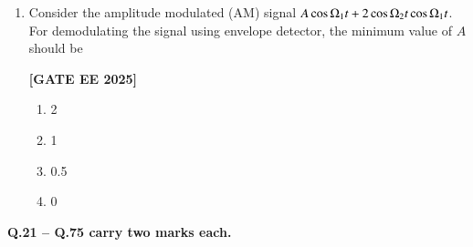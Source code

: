 \documentclass[12pt]{article}
\begin{document}
\begin{enumerate}[leftmargin=2.5em, label=\textbf{Q.\arabic*}., itemsep=2em]
\item Consider the amplitude modulated (AM) signal $A\cos\ohm_1 t+2\cos\ohm_2 t\cos\ohm_1 t$. For demodulating the signal using envelope detector, the minimum value of $A$ should be
 
\noindent \textbf{[GATE EE 2025]}
\begin{enumerate}
  \item 2
  \item 1
  \item 0.5
  \item 0
\end{enumerate}

\end{enumerate}

\vspace{1em}
\large \textbf {Q.21 – Q.75 carry two marks each.}
\vspace{1em}
\end{document}
